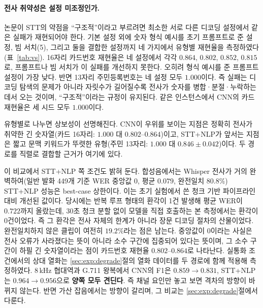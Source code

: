 \documentclass[11pt]{article}
\renewcommand{\emph}[1]{\textbf{#1}}
\begin{document}
\paragraph{전사 취약성은 설정 미조정인가.}
논문이 STT의 약점을 ``구조적''이라고 부르려면 최소한 서로 다른 디코딩 설정에서 같은 실패가
재현되어야 한다. 기본 설정 외에 숫자 형식 예시를 초기 프롬프트로 준 설정, 빔 서치(5), 그리고
둘을 결합한 설정까지 네 가지에서 유형별 재현율을 측정하였다(표~\ref{tab:vs}). 16자리
카드번호 재현율은 네 설정에서 각각 $0.864$, $0.802$, $0.852$, $0.815$로, 프롬프트나 빔 서치가
이 실패를 개선하지 못한다. 오히려 형식 예시를 준 프롬프트 설정이 가장 낮다. 반면 13자리
주민등록번호는 네 설정 모두 $1.000$이다. 즉 실패는 디코딩 탐색의 문제가 아니라 자릿수가
길어질수록 전사가 숫자를 병합·분절·누락하는 데서 오는 것이며, ``구조적''이라는 규정이
유지된다. 같은 인스턴스에서 CNN의 카드 재현율은 세 시드 모두 $1.000$이다.

유형별로 나누면 상보성이 선명해진다. CNN이 우위를 보이는 지점은 정확히 전사가 취약한 긴
숫자열(카드 16자리: $1.000$ 대 $0.802$--$0.864$)이고, STT+NLP가 앞서는 지점은 짧고 문맥
키워드가 뚜렷한 유형(주민 13자리: $1.000$ 대 $0.846\pm0.042$)이다. 두 경로를 직렬로 결합할
근거가 여기에 있다.

이 비교에서 STT+NLP 쪽 조건도 밝혀 둔다. 합성음에서는 Whisper 전사가 거의 완벽하여(일반 발화
449개 기준 WER 중앙값 $0$, 평균 $0.079$, 완전일치 $80.8\%$) STT+NLP 성능은 best-case 상한이다.
이는 초기 실험에서 쓴 청크 기반 파이프라인 대비 개선된 값이다. 당시에는 반복 루프 형태의 환각이
1건 발생해 평균 WER이 $0.722$까지 올랐는데, 30초 청크 분할 없이 모델을 직접 호출하는 본
측정에서는 환각이 0건이었다. 즉 그 환각은 전사 자체의 한계가 아니라 장문 디코딩 절차의
산물이었다. 완전일치하지 않은 클립이 여전히 $19.2\%$라는 점은 남는다. 중앙값이 0이라는 사실은
전사 오류가 사라졌다는 뜻이 아니라 소수
구간에 집중되어 있다는 뜻이며, 그 소수 구간이 하필 긴 숫자열이라는 점이 카드번호 재현율
$0.802$--$0.864$로 나타난다. 실통화 조건에서의 상대 열화는 \ref{sec:exp:degrade}절의 열화
데이터를 두 경로에 함께 적용해 측정하였다. 8\,kHz 협대역과 G.711 왕복에서 CNN의 F1은
$0.859\to0.831$, STT+NLP는 $0.964\to0.956$으로 \emph{양쪽 모두 견딘다}. 즉 채널 요인만
놓고 보면 격차의 방향이 바뀌지 않는다. 반면 가산 잡음에서는 방향이 갈리며, 그
비교는 \ref{sec:exp:degrade}절에서 다룬다.
\end{document}
